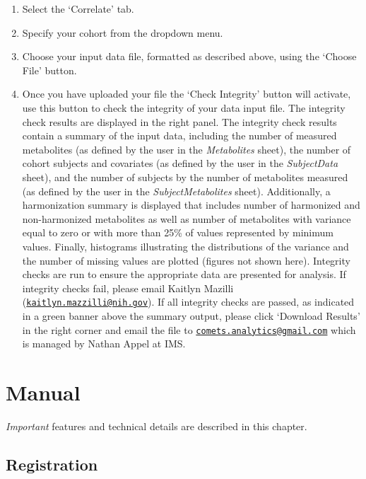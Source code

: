 \documentclass[]{book}
\providecommand{\tightlist}{%
  \setlength{\itemsep}{0pt}\setlength{\parskip}{0pt}}
\begin{document}
\begin{enumerate}
\def\labelenumi{\arabic{enumi}.}
\tightlist
\item
  Select the `Correlate' tab.
\item
  Specify your cohort from the dropdown menu.
\item
  Choose your input data file, formatted as described above, using the
  `Choose File' button.
\item
  Once you have uploaded your file the `Check Integrity' button will
  activate, use this button to check the integrity of your data input
  file. The integrity check results are displayed in the right panel.
  The integrity check results contain a summary of the input data,
  including the number of measured metabolites (as defined by the user
  in the \emph{Metabolites} sheet), the number of cohort subjects and
  covariates (as defined by the user in the \emph{SubjectData} sheet),
  and the number of subjects by the number of metabolites measured (as
  defined by the user in the \emph{SubjectMetabolites} sheet).
  Additionally, a harmonization summary is displayed that includes
  number of harmonized and non-harmonized metabolites as well as number
  of metabolites with variance equal to zero or with more than 25\% of
  values represented by minimum values. Finally, histograms illustrating
  the distributions of the variance and the number of missing values are
  plotted (figures not shown here). Integrity checks are run to ensure
  the appropriate data are presented for analysis. If integrity checks
  fail, please email Kaitlyn Mazilli
  (\href{mailto:kaitlyn.mazzilli@nih.gov}{\nolinkurl{kaitlyn.mazzilli@nih.gov}}).
  If all integrity checks are passed, as indicated in a green banner
  above the summary output, please click `Download Results' in the right
  corner and email the file to
  \href{mailto:comets.analytics@gmail.com}{\nolinkurl{comets.analytics@gmail.com}}
  which is managed by Nathan Appel at IMS.
\end{enumerate}

\hypertarget{manual}{\chapter{Manual}\label{manual}}

\emph{Important} features and technical details are described in this
chapter.

\hypertarget{register}{\section{Registration}\label{register}}
\end{document}
